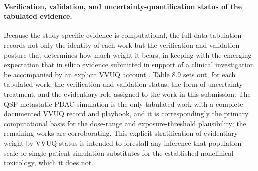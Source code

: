 \paragraph{Verification, validation, and uncertainty-quantification status of the tabulated evidence.}
Because the study-specific evidence is computational, the full data tabulation
records not only the identity of each work but the verification and validation
posture that determines how much weight it bears, in keeping with the emerging
expectation that in silico evidence submitted in support of a clinical
investigation be accompanied by an explicit VVUQ account \cite{qspmetpancre,clintrustpai}.
Table 8.9 sets out, for each tabulated work, the verification and validation status,
the form of uncertainty treatment, and the evidentiary role assigned to the work in
this submission. The QSP metastatic-PDAC simulation is the only tabulated work with
a complete documented VVUQ record and playbook, and it is correspondingly the
primary computational basis for the dose-range and exposure-threshold plausibility;
the remaining works are corroborating. This explicit stratification of evidentiary
weight by VVUQ status is intended to forestall any inference that population-scale
or single-patient simulation substitutes for the established nonclinical toxicology,
which it does not.


